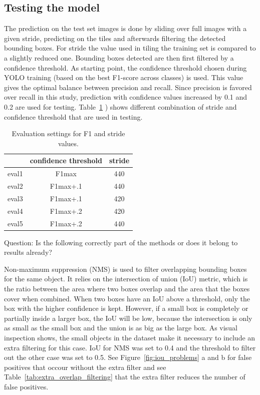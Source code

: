 \documentclass[12pt,a4paper]{article}
\begin{document}
\subsection{Testing the model}



The prediction on the test set images is done by sliding over full images with a given stride, predicting on the tiles and afterwards filtering the detected bounding boxes. For stride the value used in tiling the training set is compared to a slightly reduced one. Bounding boxes detected are then first filtered by a confidence threshold. As starting point, the confidence threshold chosen during YOLO training (based on the best F1-score across classes) is used. This value gives the optimal balance between precision and recall. Since precision is favored over recall in this study, prediction with confidence values increased by 0.1 and 0.2 are used for testing. Table~\ref{tab:eval_param} ) shows different combination of stride and confidence threshold that are used in testing.

\begin{table}[h!]
\centering
\begin{tabular}{|c|c|c|}
\hline
 & confidence threshold & stride \\
\hline
eval1 & F1max & 440 \\
eval2 & F1max+.1 & 440 \\
eval3 & F1max+.1 & 420 \\
eval4 & F1max+.2 & 420 \\
eval5 & F1max+.2 & 440 \\
\hline
\end{tabular}
\caption{Evaluation settings for F1 and stride values.}
\label{tab:eval_param}
\end{table}

{\color{red} Question: Is the following correctly part of the methods or does it belong to results already?}

Non-maximum suppression (NMS) is used to filter overlapping bounding boxes for the same object. It relies on the intersection of union (IoU) metric, which is the ratio between the area where two boxes overlap and the area that the boxes cover when combined. When two boxes have an IoU above a threshold, only the box with the higher confidence is kept. However, if a small box is completely or partially inside a larger box, the IoU will be low, because the intersection is only as small as the small box and the union is as big as the large box. As visual inspection shows, the small objects in the dataset make it necessary to include an extra filtering for this case. IoU for NMS was set to 0.4 and the threshold to filter out the other case was set to 0.5. See Figure~\ref{fig:iou_problems} a and b for false positives that occour without the extra filter and see Table~\ref{tab:extra_overlap_filtering} that the extra filter reduces the number of false positives.
\end{document}
